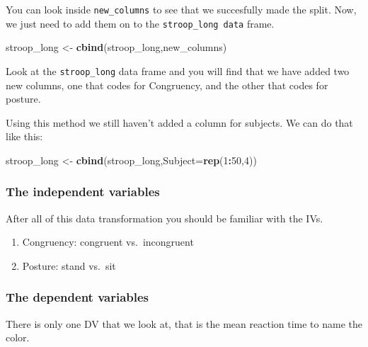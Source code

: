 \documentclass[
]{book}
\newenvironment{Shaded}{\begin{snugshade}}{\end{snugshade}}
\newcommand{\AttributeTok}[1]{\textcolor[rgb]{0.13,0.29,0.53}{#1}}
\newcommand{\DecValTok}[1]{\textcolor[rgb]{0.00,0.00,0.81}{#1}}
\newcommand{\FunctionTok}[1]{\textcolor[rgb]{0.13,0.29,0.53}{\textbf{#1}}}
\newcommand{\NormalTok}[1]{#1}
\newcommand{\OtherTok}[1]{\textcolor[rgb]{0.56,0.35,0.01}{#1}}
\newcommand{\SpecialCharTok}[1]{\textcolor[rgb]{0.81,0.36,0.00}{\textbf{#1}}}
\providecommand{\tightlist}{%
  \setlength{\itemsep}{0pt}\setlength{\parskip}{0pt}}
\begin{document}
You can look inside \texttt{new\_columns} to see that we succesfully made the
split. Now, we just need to add them on to the \texttt{stroop\_long\ data} frame.

\begin{Shaded}
\begin{Highlighting}[]
\NormalTok{stroop\_long }\OtherTok{\textless{}{-}} \FunctionTok{cbind}\NormalTok{(stroop\_long,new\_columns)}
\end{Highlighting}
\end{Shaded}

Look at the \texttt{stroop\_long} data frame and you will find that we have
added two new columns, one that codes for Congruency, and the other that
codes for posture.

Using this method we still haven't added a column for subjects. We can
do that like this:

\begin{Shaded}
\begin{Highlighting}[]
\NormalTok{stroop\_long }\OtherTok{\textless{}{-}} \FunctionTok{cbind}\NormalTok{(stroop\_long,}\AttributeTok{Subject=}\FunctionTok{rep}\NormalTok{(}\DecValTok{1}\SpecialCharTok{:}\DecValTok{50}\NormalTok{,}\DecValTok{4}\NormalTok{))}
\end{Highlighting}
\end{Shaded}

\hypertarget{the-independent-variables}{%
\subsubsection{The independent variables}\label{the-independent-variables}}

After all of this data transformation you should be familiar with the
IVs.

\begin{enumerate}
\def\labelenumi{\arabic{enumi}.}
\tightlist
\item
  Congruency: congruent vs.~incongruent
\item
  Posture: stand vs.~sit
\end{enumerate}

\hypertarget{the-dependent-variables-1}{%
\subsubsection{The dependent variables}\label{the-dependent-variables-1}}

There is only one DV that we look at, that is the mean reaction time to
name the color.
\end{document}
